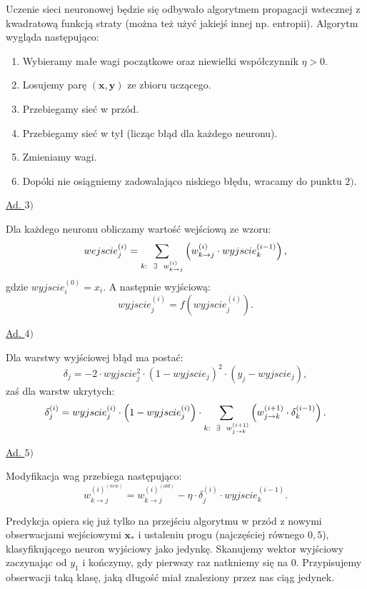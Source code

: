 \documentclass{mini}
\begin{document}
Uczenie sieci neuronowej będzie się odbywało algorytmem propagacji wstecznej z kwadratową funkcją straty (można też użyć jakiejś innej np. entropii). Algorytm wygląda następująco:
\begin{enumerate}
\item Wybieramy małe wagi początkowe oraz niewielki współczynnik $\eta>0$.
\item Losujemy parę $(\textbf{x},\textbf{y})$ ze zbioru uczącego.
\item Przebiegamy sieć w przód.
\item Przebiegamy sieć w tył (licząc błąd dla każdego neuronu).
\item Zmieniamy wagi.
\item Dopóki nie osiągniemy zadowalająco niskiego błędu, wracamy do punktu $2)$.
\end{enumerate} 

\underline{Ad. $3)$} 

Dla każdego neuronu obliczamy wartość wejściową ze wzoru:
$$
wejscie_j^{(i)} = \sum_{k:\hspace{2mm}\exists\hspace{2mm} w^{(i)}_{k\rightarrow j}} \left( w^{(i)}_{k\rightarrow j}\cdot wyjscie_k^{(i-1)} \right),
$$
gdzie $wyjscie_i^{(0)} = x_i$. A następnie wyjściową:
$$
wyjscie_j^{(i)} = f\left(wyjscie_j^{(i)}\right). 
$$

\underline{Ad. $4)$}

Dla warstwy wyjściowej błąd ma postać:
$$
\delta_j = -2\cdot wyjscie_j^2\cdot \left( 1- wyjscie_j \right)^2\cdot(y_j - wyjscie_j),
$$
zaś dla warstw ukrytych:
$$
\delta_j^{(i)} =  wyjscie_j^{(i)}\cdot \left( 1- wyjscie_j^{(i)} \right) \cdot \sum_{k:\hspace{2mm}\exists\hspace{2mm} w^{(i+1)}_{j\rightarrow k}} \left( w^{(i+1)}_{j\rightarrow k}\cdot \delta_k^{(i-1)} \right).
$$

\underline{Ad. $5)$}

Modyfikacja wag przebiega następująco:
$$
w_{k\rightarrow j}^{(i)^{(new)}} = w_{k\rightarrow j}^{(i)^{(old)}} - \eta\cdot\delta_j^{(i)}\cdot wyjscie^{(i-1)}_k.
$$

Predykcja opiera się już tylko na przejściu algorytmu w przód z nowymi obserwacjami wejściowymi $\textbf{x}_{\ast}$ i ustaleniu progu (najczęściej równego $0,5$), klasyfikującego neuron wyjściowy jako jedynkę. Skanujemy wektor wyjściowy zaczynając od $y_1$ i kończymy, gdy pierwszy raz natkniemy się na $0$. Przypisujemy obserwacji taką klasę, jaką długość miał znaleziony przez nas ciąg jedynek.
\end{document}
